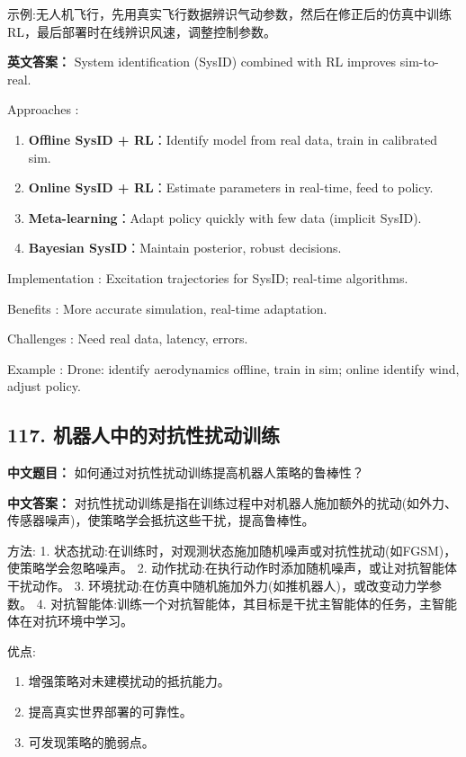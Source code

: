 \documentclass[10pt,a4paper]{ctexart}
\begin{document}
 示例:无人机飞行，先用真实飞行数据辨识气动参数，然后在修正后的仿真中训练RL，最后部署时在线辨识风速，调整控制参数。

\textbf{英文答案：}  
System identification (SysID) combined with RL improves sim-to-real.

 Approaches :
\begin{enumerate}
    \item \textbf{Offline SysID + RL}：Identify model from real data, train in calibrated sim.
    \item \textbf{Online SysID + RL}：Estimate parameters in real-time, feed to policy.
    \item \textbf{Meta-learning}：Adapt policy quickly with few data (implicit SysID).
    \item \textbf{Bayesian SysID}：Maintain posterior, robust decisions.
\end{enumerate}

 Implementation : Excitation trajectories for SysID; real-time algorithms.

 Benefits : More accurate simulation, real-time adaptation.

 Challenges : Need real data, latency, errors.

 Example : Drone: identify aerodynamics offline, train in sim; online identify wind, adjust policy.

\subsection*{117. 机器人中的对抗性扰动训练}
\textbf{中文题目：} 如何通过对抗性扰动训练提高机器人策略的鲁棒性？

\textbf{中文答案：}  
对抗性扰动训练是指在训练过程中对机器人施加额外的扰动(如外力、传感器噪声)，使策略学会抵抗这些干扰，提高鲁棒性。

 方法:
1.  状态扰动:在训练时，对观测状态施加随机噪声或对抗性扰动(如FGSM)，使策略学会忽略噪声。
2.  动作扰动:在执行动作时添加随机噪声，或让对抗智能体干扰动作。
3.  环境扰动:在仿真中随机施加外力(如推机器人)，或改变动力学参数。
4.  对抗智能体:训练一个对抗智能体，其目标是干扰主智能体的任务，主智能体在对抗环境中学习。

 优点:
\begin{enumerate}
    \item 增强策略对未建模扰动的抵抗能力。
    \item 提高真实世界部署的可靠性。
    \item 可发现策略的脆弱点。
\end{enumerate}
\end{document}
